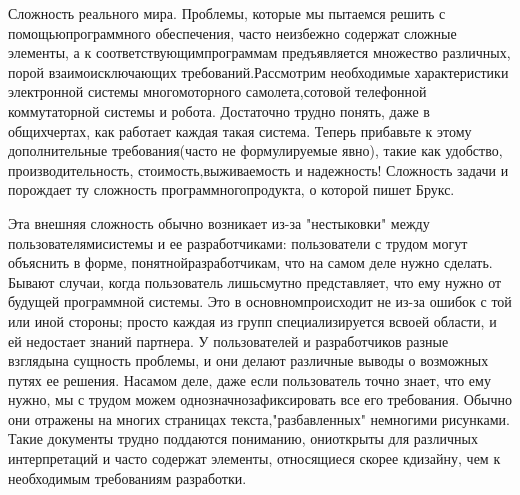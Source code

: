 \documentclass[10pt]{article}
\begin{document}
Сложность реального мира. Проблемы, которые мы пытаемся решить с помощью\linebreak  программного обеспечения, часто неизбежно содержат сложные элементы, а к соответствующим\linebreak  программам предъявляется множество различных, порой взаимоисключающих требований.\linebreak  Рассмотрим необходимые характеристики электронной системы многомоторного самолета,\linebreak  сотовой телефонной коммутаторной системы и робота. Достаточно трудно понять, даже в общих\linebreak  чертах, как работает каждая такая система. Теперь прибавьте к этому дополнительные требования\linebreak  (часто не формулируемые явно), такие как удобство, производительность, стоимость,\linebreak  выживаемость и надежность! Сложность задачи и порождает ту сложность программного\linebreak  продукта, о которой пишет Брукс. 

Эта внешняя сложность обычно возникает из-за "нестыковки" между пользователями\linebreak  системы и ее разработчиками: пользователи с трудом могут объяснить в форме, понятной\linebreak  разработчикам, что на самом деле нужно сделать. Бывают случаи, когда пользователь лишь\linebreak  смутно представляет, что ему нужно от будущей программной системы. Это в основном\linebreak  происходит не из-за ошибок с той или иной стороны; просто каждая из групп специализируется в\linebreak  своей области, и ей недостает знаний партнера. У пользователей и разработчиков разные взгляды\linebreak  на сущность проблемы, и они делают различные выводы о возможных путях ее решения. На\linebreak  самом деле, даже если пользователь точно знает, что ему нужно, мы с трудом можем однозначно\linebreak  зафиксировать все его требования. Обычно они отражены на многих страницах текста,\linebreak  "разбавленных" немногими рисунками. Такие документы трудно поддаются пониманию, они\linebreak  открыты для различных интерпретаций и часто содержат элементы, относящиеся скорее к\linebreak  дизайну, чем к необходимым требованиям разработки.
 
\end{document}
